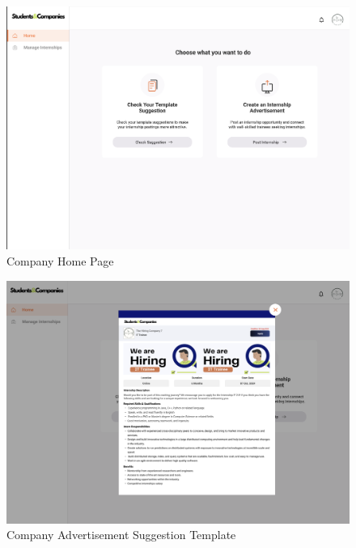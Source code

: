 \documentclass[a4paper,12pt]{article}
\begin{document}
\begin{figure}[H]
    \centering
    \includegraphics[scale = 0.42]{figures/UserInterfaces/Company/CompanyHome.png}
    \caption{Company Home Page}
     \centering
\end{figure}
\begin{figure}[H]
    \centering
    \includegraphics[scale = 0.40]{figures/UserInterfaces/Company/CompanySuggestion.png}
    \caption{Company Advertisement Suggestion Template}
     \centering
\end{figure}
\end{document}
